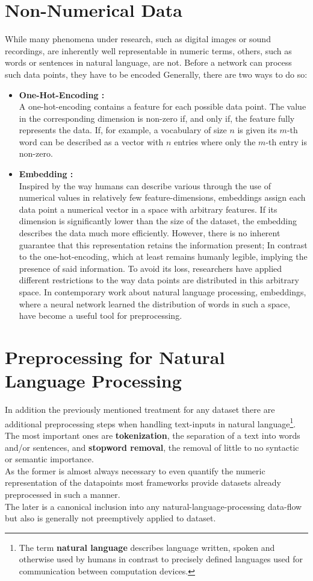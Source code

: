 \section{Non-Numerical Data}
While many phenomena under research, such as digital images or sound recordings, are inherently well representable in numeric terms, others, such as words or sentences in natural language, are not. Before a network can process such data points, they have to be encoded
Generally, there are two ways to do so:
\begin{itemize}
	\item \textbf{One-Hot-Encoding :}\\
	A one-hot-encoding contains a feature for each possible data point. The value in the corresponding dimension is non-zero if, and only if, the feature fully represents the data.
	If, for example, a vocabulary of size $n$ is given its $m$-th word can be described as a vector with $n$ entries where only the $m$-th entry is non-zero.\\
	\item \textbf{Embedding :}\\
	
	Inspired by the way humans can describe various through the use of numerical values in relatively few feature-dimensions, embeddings assign each data point a numerical vector in a space with arbitrary features. If its dimension is significantly lower than the size of the dataset, the embedding describes the data much more efficiently. However, there is no inherent guarantee that this representation retains the information present; In contrast to the one-hot-encoding, which at least remains humanly legible, implying the presence of said information. To avoid its loss, researchers have applied different restrictions to the way data points are distributed in this arbitrary space.
	In contemporary work about natural language processing, embeddings, where a neural network learned the distribution of words in such a space, have become a useful tool for preprocessing. \cite{Word2Vec}
\end{itemize} 

\section{Preprocessing for Natural Language Processing}
In addition the previously mentioned treatment for any dataset there are additional preprocessing steps when handling text-inputs in natural language\footnote{The term \textbf{natural language} describes language written, spoken and otherwise used by humans in contrast to precisely defined languages used for communication between computation devices.}. The most important ones are \textbf{tokenization}, the separation of a text into words and/or sentences, and \textbf{stopword removal}, the removal of little to no syntactic or semantic importance.\\
As the former is almost always necessary to even quantify the numeric representation of the datapoints most frameworks provide datasets already preprocessed in such a manner.\\
The later is a canonical inclusion into any natural-language-processing data-flow but also is generally not preemptively applied to dataset.